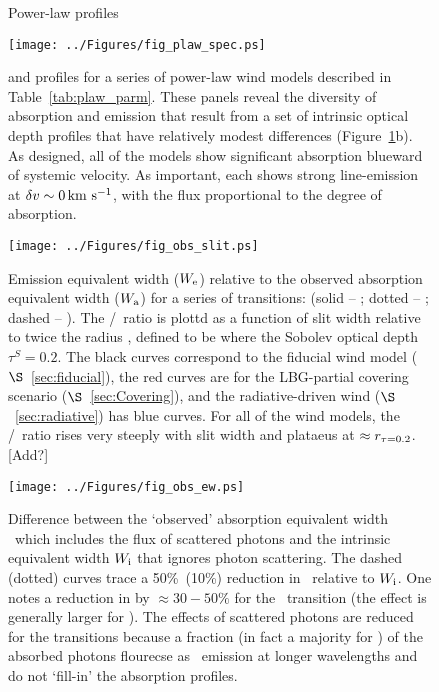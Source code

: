 \documentclass[12pt,preprint]{aastex}
\begin{document}
\begin{figure}
\caption{
Power-law profiles
}
\label{fig:plaws}
\end{figure}

\begin{figure}
\texttt{[image: ../Figures/fig\_plaw\_spec.ps]}
\caption{
 and  profiles for a series of power-law wind
models described in Table~\ref{tab:plaw_parm}.  These panels reveal
the diversity of absorption and emission that result from a set of
intrinsic optical depth profiles that have relatively modest
differences (Figure~\ref{fig:plaws}b).  As designed, all of the models
show significant absorption blueward of systemic velocity.  As
important, each shows strong line-emission at $\delta v \sim 0 \, {\rm km~s^{-1}}$,
with the flux proportional to the degree of absorption.
}
\label{fig:plaws_spec}
\end{figure}


\begin{figure}
\texttt{[image: ../Figures/fig\_obs\_slit.ps]}
\caption{
Emission equivalent width ($W_{\rm e}$) relative to the observed
absorption equivalent width ($W_{\rm a}$) for a series of transitions:
(solid -- \mgiia; dotted -- \mgiib; dashed -- \feiib).  The
\ewe/\ewabs\ ratio is plottd as a function of slit width relative to
twice the radius \rtt, defined to be where the Sobolev optical depth 
$\tau^S = 0.2$.  The black curves correspond to the fiducial wind
model ($\S$~\ref{sec:fiducial}), the red curves are for the
LBG-partial covering scenario ($\S$~\ref{sec:Covering}), and the
radiative-driven wind ($\S$~\ref{sec:radiative}) has blue curves.
For all of the wind models, the \ewe/\ewabs\ ratio rises very steeply
with slit width and plataeus at $\approx r_{\tau = 0.2}$.  [Add?]
}
\label{fig:obs_slit}
\end{figure}

\begin{figure}
\texttt{[image: ../Figures/fig\_obs\_ew.ps]}
\caption{
Difference between the `observed' absorption equivalent width \ewabs\
which includes the flux of scattered photons and the intrinsic
equivalent width $W_{\rm i}$ that ignores photon scattering.  The
dashed (dotted) curves trace a 50\%\ (10\%) reduction in \ewabs\
relative to $W_{\rm i}$.  One notes a reduction in \ewabs by $\approx
30-50\%$ for the \mgiia\ transition (the effect is generally larger
for \mgiib).  The effects of scattered photons are reduced for the
\ion{Fe}{2} transitions because a fraction (in fact a majority for
\feiia) of the absorbed photons flourecse as \feiis\ emission at
longer wavelengths and do not `fill-in' the absorption profiles.
}
\label{fig:obs_ew}
\end{figure}
\end{document}
